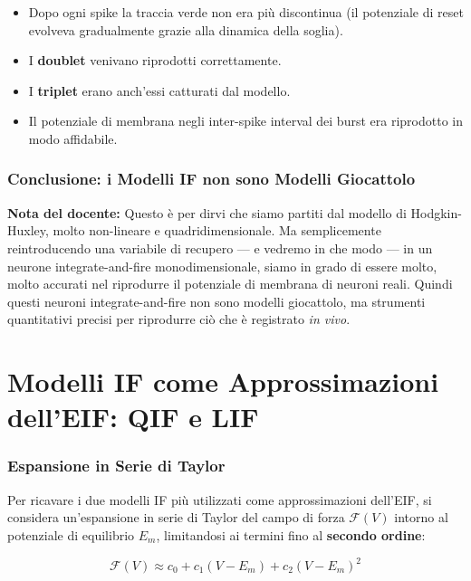 \begin{itemize}
    \item Dopo ogni spike la traccia verde non era più discontinua (il potenziale di reset evolveva gradualmente grazie alla dinamica della soglia).
    \item I \textbf{doublet} venivano riprodotti correttamente.
    \item I \textbf{triplet} erano anch'essi catturati dal modello.
    \item Il potenziale di membrana negli inter-spike interval dei burst era riprodotto in modo affidabile.
\end{itemize}

\subsubsection{Conclusione: i Modelli IF non sono Modelli Giocattolo}

\begin{tcolorbox}[colback=gray!5, colframe=gray!40, arc=2mm, boxrule=0.5pt]
\textbf{Nota del docente:} Questo è per dirvi che siamo partiti dal modello di Hodgkin-Huxley, molto non-lineare e quadridimensionale. Ma semplicemente reintroducendo una variabile di recupero — e vedremo in che modo — in un neurone integrate-and-fire monodimensionale, siamo in grado di essere molto, molto accurati nel riprodurre il potenziale di membrana di neuroni reali. Quindi questi neuroni integrate-and-fire non sono modelli giocattolo, ma strumenti quantitativi precisi per riprodurre ciò che è registrato \textit{in vivo}.
\end{tcolorbox}


\section{Modelli IF come Approssimazioni dell'EIF: QIF e LIF}

\subsubsection{Espansione in Serie di Taylor}

Per ricavare i due modelli IF più utilizzati come approssimazioni dell'EIF, si considera un'espansione in serie di Taylor del campo di forza $\mathcal{F}(V)$ intorno al potenziale di equilibrio $E_m$, limitandosi ai termini fino al \textbf{secondo ordine}:

\begin{equation}
\mathcal{F}(V) \approx c_0 + c_1(V - E_m) + c_2(V - E_m)^2
\end{equation}


